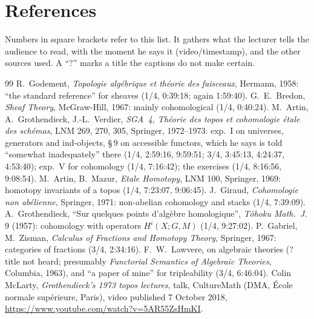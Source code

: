 \documentclass[11pt]{article}
\begin{document}
\section*{References}
\noindent Numbers in square brackets refer to this list. It gathers what the lecturer tells the audience to read, with the moment he says it (video/timestamp), and the other sources used. A ``?'' marks a title the captions do not make certain.
\begingroup\renewcommand{\section}[2]{}\setlength{\itemsep}{1pt}\small
\begin{thebibliography}{99}
 R.~Godement, \emph{Topologie algébrique et théorie des faisceaux}, Hermann, 1958: ``the standard reference'' for sheaves (1/4, 0:39:18; again 1:59:40).
 G.~E.~Bredon, \emph{Sheaf Theory}, McGraw-Hill, 1967: mainly cohomological (1/4, 0:40:24).
 M.~Artin, A.~Grothendieck, J.-L.~Verdier, \emph{SGA~4, Théorie des topos et cohomologie étale des schémas}, LNM 269, 270, 305, Springer, 1972--1973: exp.~I on universes, generators and ind-objects, \S\,9 on accessible functors, which he says is told ``somewhat inadequately'' there (1/4, 2:59:16, 9:59:51; 3/4, 3:45:13, 4:24:37, 4:53:40); exp.~V for cohomology (1/4, 7:16:42); the exercises (1/4, 8:16:56, 9:08:54).
 M.~Artin, B.~Mazur, \emph{Etale Homotopy}, LNM 100, Springer, 1969: homotopy invariants of a topos (1/4, 7:23:07, 9:06:45).
 J.~Giraud, \emph{Cohomologie non abélienne}, Springer, 1971: non-abelian cohomology and stacks (1/4, 7:39:09).
 A.~Grothendieck, ``Sur quelques points d'algèbre homologique'', \emph{Tôhoku Math.~J.} 9 (1957): cohomology with operators $H^i(X;G,M)$ (1/4, 9:27:02).
 P.~Gabriel, M.~Zisman, \emph{Calculus of Fractions and Homotopy Theory}, Springer, 1967: categories of fractions (3/4, 2:34:16).
 F.~W.~Lawvere, on algebraic theories (? title not heard; presumably \emph{Functorial Semantics of Algebraic Theories}, Columbia, 1963), and ``a paper of mine'' for tripleability (3/4, 6:46:04).
 Colin McLarty, \emph{Grothendieck's 1973 topos lectures}, talk, CultureMath (DMA, École normale supérieure, Paris), video published 7 October 2018, \url{https://www.youtube.com/watch?v=5AR55ZsHmKI}.
\end{thebibliography}
\endgroup
\end{document}
